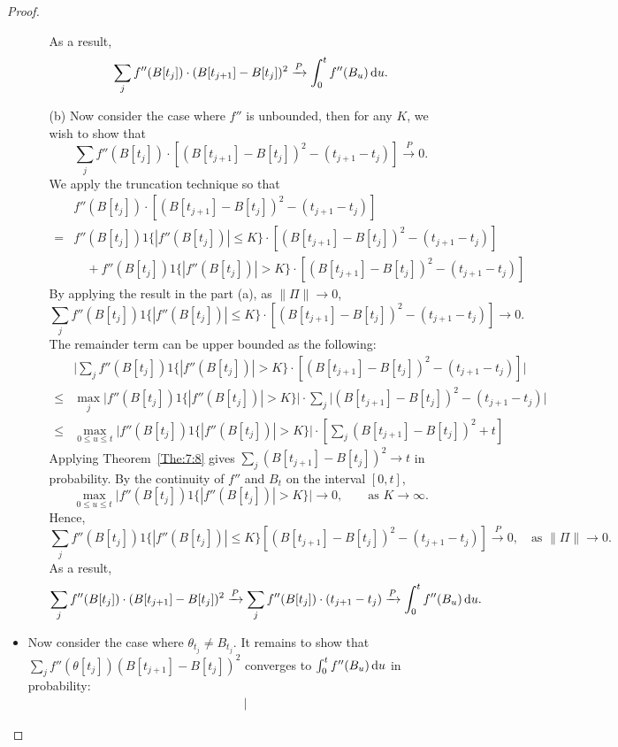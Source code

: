 \begin{proof}
\begin{itemize}
\begin{itemize}
As a result, \[\sum_jf''(B[t_{j}])\cdot(B[t_{j+1}] - B[t_{j}])^2
\xrightarrow{P}\int_0^tf''(B_u)\,\mathrm{d} u.\]
\item[(b)]
Now consider the case where $f''$ is unbounded, then for any $K$, we wish to show that 
\[
\sum_jf''(B[t_{j}])\cdot\left[(B[t_{j+1}] - B[t_{j}])^2
-(t_{j+1}-t_{j})
\right]
\xrightarrow{P}
0.
\]
We apply the truncation technique so that
\begin{align*}
&f''(B[t_{j}])\cdot\left[(B[t_{j+1}] - B[t_{j}])^2
-(t_{j+1}-t_{j})
\right]\\=&
f''(B[t_{j}])1\{|f''(B[t_{j}])|\le K\}\cdot\left[(B[t_{j+1}] - B[t_{j}])^2
-(t_{j+1}-t_{j})
\right]\\
&\quad  + f''(B[t_{j}])1\{|f''(B[t_{j}])|> K\}\cdot\left[(B[t_{j+1}] - B[t_{j}])^2
-(t_{j+1}-t_{j})
\right]
\end{align*}
By applying the result in the part (a), as $\|\Pi\|\to0$, 
\[
\sum_jf''(B[t_{j}])1\{|f''(B[t_{j}])|\le K\}\cdot\left[(B[t_{j+1}] - B[t_{j}])^2
-(t_{j+1}-t_{j})
\right]\to0.
\]
The remainder term can be upper bounded as the following:
\begin{align*}
&\bigg|
\sum_jf''(B[t_{j}])1\{|f''(B[t_{j}])|> K\}\cdot\left[(B[t_{j+1}] - B[t_{j}])^2
-(t_{j+1}-t_{j})
\right]
\bigg|\\
\le&\max_j\bigg|
f''(B[t_{j}])1\{|f''(B[t_{j}])|> K\}
\bigg|\cdot\sum_j\bigg|
(B[t_{j+1}] - B[t_{j}])^2
-(t_{j+1}-t_{j})
\bigg|\\
\le&\max_{0\le u\le t}\bigg|
f''(B[t_{j}])1\{|f''(B[t_{j}])|> K\}
\bigg|\cdot\left[
\sum_j(B[t_{j+1}] - B[t_{j}])^2+t
\right]
\end{align*}
Applying Theorem~\ref{The:7:8} gives $\sum_j(B[t_{j+1}] - B[t_{j}])^2\to t$ in probability.
By the continuity of $f''$ and $B_t$ on the interval $[0,t]$, 
\[
\max_{0\le u\le t}\bigg|
f''(B[t_{j}])1\{|f''(B[t_{j}])|> K\}
\bigg|\to0,\qquad\text{as }K\to\infty.
\]
Hence,
\[
\sum_jf''(B[t_{j}])1\{|f''(B[t_{j}])|\le K\}\left[(B[t_{j+1}] - B[t_{j}])^2
-(t_{j+1}-t_{j})
\right]\xrightarrow{P}0,\quad\text{as }\|\Pi\|\to0.
\]
As a result, 
\[\sum_jf''(B[t_{j}])\cdot(B[t_{j+1}] - B[t_{j}])^2\xrightarrow{P}
\sum_jf''(B[t_{j}])\cdot(t_{j+1}-t_{j})\xrightarrow{P}\int_0^tf''(B_u)\,\mathrm{d} u.
\]
\end{itemize}
\item
Now consider the case where $\theta_{t_j}\ne B_{t_j}$. 
It remains to show that $\sum_jf''(\theta[t_j])(B[t_{j+1}] - B[t_j])^2$ converges to $\int_0^tf''(B_u)\,\mathrm{d} u$ in probability:
\begin{align*}
&\bigg|

\end{align*}
\end{itemize}
\end{proof}
